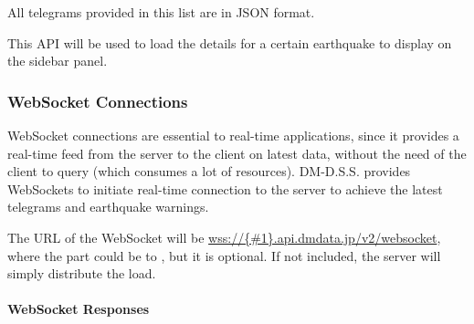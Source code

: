 All telegrams provided in this list are in JSON format.

This API will be used to load the details for a certain earthquake to display on the sidebar panel.

\subsubsection{WebSocket Connections}

WebSocket connections are essential to real-time applications, since it provides a real-time feed from the server to the client on latest data, without the need of the client to query (which consumes a lot of resources). DM-D.S.S. provides WebSockets to initiate real-time connection to the server to achieve the latest telegrams and earthquake warnings.

The URL of the WebSocket will be \url{wss://{#1}.api.dmdata.jp/v2/websocket}, where the  part could be  to , but it is optional. If not included, the server will simply distribute the load.

\paragraph{WebSocket Responses}

